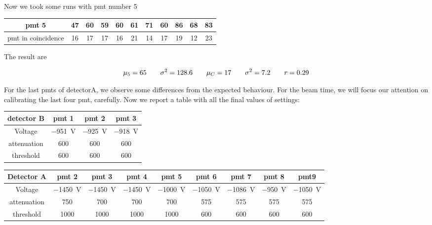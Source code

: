 \documentclass[10pt,a4paper]{article}
\begin{document}
Now we took some runs with pmt number 5

\begin{center}
\begin{tabular}{|c|c|c|c|c|c|c|c|c|c|c|}
\hline 
pmt 5 & 47 & 60 & 59 & 60 & 61 & 71 & 60 & 86 & 68 & 83 \\ 
\hline
pmt in coincidence & 16 & 17 & 17 & 16 & 21 & 14 & 17 & 19 & 12 & 23 \\ 
\hline 
\end{tabular} 
\end{center}

The result are 

\begin{equation*}
\mu_{5} = 65 \qquad \sigma^{2} = 128.6  \qquad \mu_{C} = 17 \qquad \sigma^{2} = 7.2 \qquad r = 0.29\\
\end{equation*}

For the last pmts of detectorA, we observe some differences from the expected behaviour. For the beam time, we will focus our attention on calibrating the last four pmt, carefully.\newline
Now we report a table with all the final values of settings:

\begin{center}
\begin{tabular}{|c|c|c|c|}
\hline 
\textbf{detector B} & pmt 1 & pmt 2 & pmt 3 \\ 
\hline 
Voltage & \SI{-951}{\volt} & \SI{-925}{\volt} & \SI{-918}{\volt} \\ 
\hline 
attenuation & 600 & 600 & 600 \\ 
\hline 
threshold & 600 & 600 & 600 \\ 
\hline 
\end{tabular} 
\end{center}

\begin{tabular}{|c|c|c|c|c|c|c|c|c|}
\hline 
\textbf{Detector A} & pmt 2 & pmt 3 & pmt 4 & pmt 5 & pmt 6 & pmt 7 & pmt 8 & pmt9 \\ 
\hline 
Voltage & \SI{-1450}{\volt} & \SI{-1450}{\volt} & \SI{-1450}{\volt} & \SI{-1000}{\volt} & \SI{-1050}{\volt} & \SI{-1086}{\volt} & \SI{-950}{\volt} & \SI{-1050}{\volt} \\ 
\hline 
attenuation & 750 & 700 & 700 & 700 & 575 & 575 & 575 & 575 \\ 
\hline 
threshold & 1000 & 1000 & 1000 & 1000 & 600 & 600 & 600 & 600  \\ 
\hline 
\end{tabular} 
\end{document}
